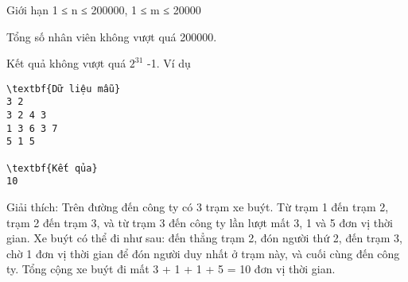 Giới hạn  
1 ≤ n ≤ 200000, 1 ≤ m ≤ 20000  

   Tổng số nhân viên không vượt quá 200000.  

   Kết quả không vượt quá $2^{31}$   -1.
   Ví dụ  
\begin{verbatim}
\textbf{Dữ liệu mẫu}
3 2
3 2 4 3
1 3 6 3 7
5 1 5

\textbf{Kết qủa}
10
\end{verbatim}

   Giải thích: Trên đường đến công ty có 3 trạm xe buýt. Từ trạm 1 đến trạm 2, trạm 2 đến trạm 3, và từ trạm 3 đến công ty lần lượt mất 3, 1 và 5 đơn vị thời gian. Xe buýt có thể đi như sau: đến thẳng trạm 2, đón người thứ 2, đến trạm 3, chờ 1 đơn vị thời gian để đón người duy nhất ở trạm này, và cuối cùng đến công ty. Tổng cộng xe buýt đi mất 3 + 1 + 1 + 5 = 10 đơn vị thời gian.